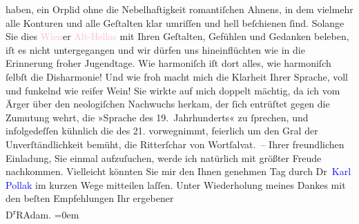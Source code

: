                     haben, ein Orplid ohne die Nebelhaftigkeit romantiſchen Ahnens, in dem vielmehr
                    alle Konturen und alle Geſtalten klar umriſſen und hell beſchienen ſind. Solange
                    Sie dies \textcolor{pink}{Wien}{}\ledrightnote{\textcolor{pink}{Wien}}er \textcolor{pink}{Alt-Hellas}{}\ledrightnote{\textcolor{pink}{Griechenland}} mit Ihren Geſtalten, Gefühlen und Gedanken beleben, iſt es
                    nicht untergegangen und wir dürfen uns hineinflüchten wie in die Erinnerung
                    froher Jugendtage. Wie harmoniſch iſt dort alles, wie harmoniſch ſelbſt die
                    Disharmonie! Und wie froh macht mich die Klarheit Ihrer {\pb}Sprache, voll und funkelnd wie
                    reifer Wein! Sie wirkte auf mich doppelt mächtig, da ich vom Ärger über den
                    neologiſchen Nachwuchs herkam, der ſich entrüſtet gegen die Zumutung wehrt, die
                    »Sprache des 19. Jahrhunderts« zu ſprechen, und infolgedeſſen kühnlich die des
                    21. vorwegnimmt, feierlich um den Gral der Unverſtändlichkeit bemüht, die
                    Ritterſchar von Wortſalvat. –\pend
           \pstart
           Ihrer freundlichen Einladung, Sie einmal aufzuſuchen, werde ich natürlich mit
                    größter Freude nachkommen. Vielleicht könnten Sie mir den Ihnen genehmen Tag
                    durch Dr \textcolor{blue}{Karl Pollak}{}\ledrightnote{\textcolor{blue}{Karl Pollak}} im kurzen Wege
                    mitteilen laſſen.\pend
           \pstart
           {\pb}Unter Wiederholung meines Dankes mit
                    den beſten Empfehlungen\pend
           \pstart
           Ihr ergebener{\\[\baselineskip]}\spacefill\mbox{D\textsuperscript{r}RAdam.}\pend
           \leftskip=0em{}\endnumbering{}  
      
